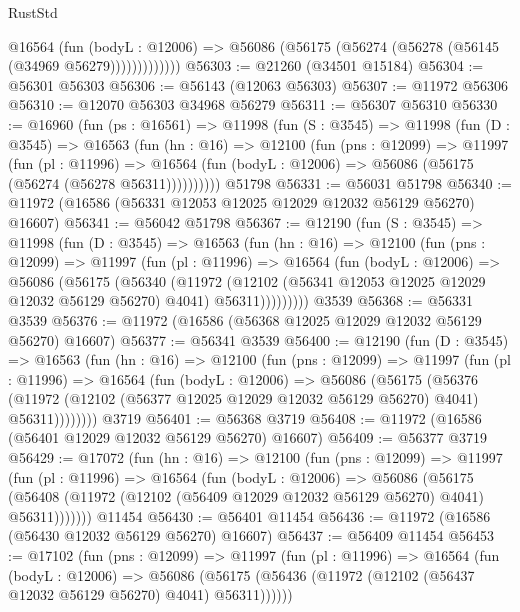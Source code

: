 \begin{lexlean}{RustStd}
\begin{coremodule}
                @16564
                  (fun (bodyL : @12006) =>
                  @56086 (@56175 (@56274 (@56278 (@56145 (@34969 @56279)))))))))))))
@56303 := @21260 (@34501 @15184)
@56304 := @56301 @56303
@56306 := @56143 (@12063 @56303)
@56307 := @11972 @56306
@56310 := @12070 @56303 @34968 @56279
@56311 := @56307 @56310
@56330 := @16960
    (fun (ps : @16561) =>
    @11998
      (fun (S : @3545) =>
      @11998
        (fun (D : @3545) =>
        @16563
          (fun (hn : @16) =>
          @12100
            (fun (pns : @12099) =>
            @11997
              (fun (pl : @11996) =>
              @16564 (fun (bodyL : @12006) => @56086 (@56175 (@56274 (@56278 @56311))))))))))
    @51798
@56331 := @56031 @51798
@56340 := @11972 (@16586 (@56331 @12053 @12025 @12029 @12032 @56129 @56270) @16607)
@56341 := @56042 @51798
@56367 := @12190
    (fun (S : @3545) =>
    @11998
      (fun (D : @3545) =>
      @16563
        (fun (hn : @16) =>
        @12100
          (fun (pns : @12099) =>
          @11997
            (fun (pl : @11996) =>
            @16564
              (fun (bodyL : @12006) =>
              @56086
                (@56175
                  (@56340
                    (@11972
                      (@12102 (@56341 @12053 @12025 @12029 @12032 @56129 @56270) @4041)
                      @56311)))))))))
    @3539
@56368 := @56331 @3539
@56376 := @11972 (@16586 (@56368 @12025 @12029 @12032 @56129 @56270) @16607)
@56377 := @56341 @3539
@56400 := @12190
    (fun (D : @3545) =>
    @16563
      (fun (hn : @16) =>
      @12100
        (fun (pns : @12099) =>
        @11997
          (fun (pl : @11996) =>
          @16564
            (fun (bodyL : @12006) =>
            @56086
              (@56175
                (@56376
                  (@11972 (@12102 (@56377 @12025 @12029 @12032 @56129 @56270) @4041) @56311))))))))
    @3719
@56401 := @56368 @3719
@56408 := @11972 (@16586 (@56401 @12029 @12032 @56129 @56270) @16607)
@56409 := @56377 @3719
@56429 := @17072
    (fun (hn : @16) =>
    @12100
      (fun (pns : @12099) =>
      @11997
        (fun (pl : @11996) =>
        @16564
          (fun (bodyL : @12006) =>
          @56086
            (@56175
              (@56408 (@11972 (@12102 (@56409 @12029 @12032 @56129 @56270) @4041) @56311)))))))
    @11454
@56430 := @56401 @11454
@56436 := @11972 (@16586 (@56430 @12032 @56129 @56270) @16607)
@56437 := @56409 @11454
@56453 := @17102
    (fun (pns : @12099) =>
    @11997
      (fun (pl : @11996) =>
      @16564
        (fun (bodyL : @12006) =>
        @56086 (@56175 (@56436 (@11972 (@12102 (@56437 @12032 @56129 @56270) @4041) @56311))))))

\end{coremodule}
\end{lexlean}
